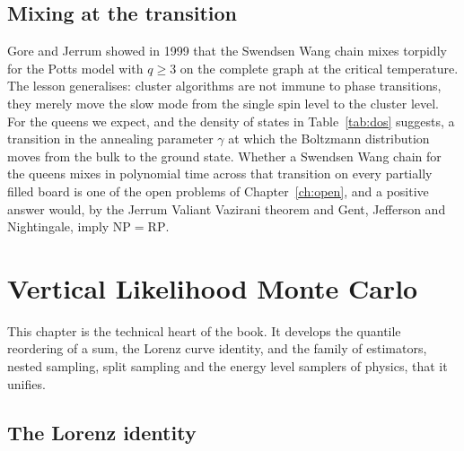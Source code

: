 \documentclass[11pt,twoside,openany]{book}
\theoremstyle{plain}
\theoremstyle{definition}
\theoremstyle{remark}
\newcommand{\RP}{\mathrm{RP}}
\newcommand{\NP}{\mathrm{NP}}
\begin{document}
\section{Mixing at the transition}

Gore and Jerrum showed in 1999 that the Swendsen Wang chain mixes torpidly for the Potts model with $q \ge 3$ on the complete graph at the critical temperature. The lesson generalises: cluster algorithms are not immune to phase transitions, they merely move the slow mode from the single spin level to the cluster level. For the queens we expect, and the density of states in Table~\ref{tab:dos} suggests, a transition in the annealing parameter $\gamma$ at which the Boltzmann distribution moves from the bulk to the ground state. Whether a Swendsen Wang chain for the queens mixes in polynomial time across that transition on every partially filled board is one of the open problems of Chapter~\ref{ch:open}, and a positive answer would, by the Jerrum Valiant Vazirani theorem and Gent, Jefferson and Nightingale, imply $\NP = \RP$.







\chapter{Vertical Likelihood Monte Carlo}
\label{ch:vertical}

This chapter is the technical heart of the book. It develops the quantile reordering of a sum, the Lorenz curve identity, and the family of estimators, nested sampling, split sampling and the energy level samplers of physics, that it unifies.

\section{The Lorenz identity}
\end{document}
